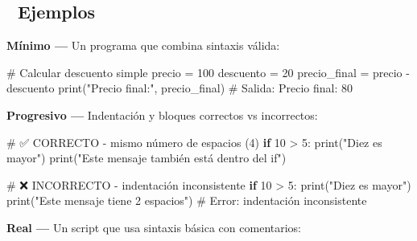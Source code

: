 \documentclass[
  doc,
  floatsintext,
  longtable,
  a4paper,
  nolmodern,
  notxfonts,
  notimes,
  12pt,
  colorlinks=true,linkcolor=blue,citecolor=blue,urlcolor=blue]{apa7}
\newenvironment{Shaded}{\begin{snugshade}}{\end{snugshade}}
\newcommand{\BuiltInTok}[1]{\textcolor[rgb]{0.00,0.23,0.31}{#1}}
\newcommand{\CommentTok}[1]{\textcolor[rgb]{0.37,0.37,0.37}{#1}}
\newcommand{\ControlFlowTok}[1]{\textcolor[rgb]{0.00,0.23,0.31}{\textbf{#1}}}
\newcommand{\DecValTok}[1]{\textcolor[rgb]{0.68,0.00,0.00}{#1}}
\newcommand{\NormalTok}[1]{\textcolor[rgb]{0.00,0.23,0.31}{#1}}
\newcommand{\OperatorTok}[1]{\textcolor[rgb]{0.37,0.37,0.37}{#1}}
\newcommand{\StringTok}[1]{\textcolor[rgb]{0.13,0.47,0.30}{#1}}
\begin{document}
\subsection{🔬 Ejemplos}\label{ejemplos}

\textbf{Mínimo ---} Un programa que combina sintaxis válida:

\begin{Shaded}
\begin{Highlighting}[]
\CommentTok{\# Calcular descuento simple}
\NormalTok{precio }\OperatorTok{=} \DecValTok{100}
\NormalTok{descuento }\OperatorTok{=} \DecValTok{20}
\NormalTok{precio\_final }\OperatorTok{=}\NormalTok{ precio }\OperatorTok{{-}}\NormalTok{ descuento}
\BuiltInTok{print}\NormalTok{(}\StringTok{"Precio final:"}\NormalTok{, precio\_final)}
\CommentTok{\# Salida: Precio final: 80}
\end{Highlighting}
\end{Shaded}

\textbf{Progresivo ---} Indentación y bloques correctos vs incorrectos:

\begin{Shaded}
\begin{Highlighting}[]
\CommentTok{\# ✅ CORRECTO {-} mismo número de espacios (4)}
\ControlFlowTok{if} \DecValTok{10} \OperatorTok{\textgreater{}} \DecValTok{5}\NormalTok{:}
    \BuiltInTok{print}\NormalTok{(}\StringTok{"Diez es mayor"}\NormalTok{)}
    \BuiltInTok{print}\NormalTok{(}\StringTok{"Este mensaje también está dentro del if"}\NormalTok{)}

\CommentTok{\# ❌ INCORRECTO {-} indentación inconsistente}
\ControlFlowTok{if} \DecValTok{10} \OperatorTok{\textgreater{}} \DecValTok{5}\NormalTok{:}
    \BuiltInTok{print}\NormalTok{(}\StringTok{"Diez es mayor"}\NormalTok{)}
  \BuiltInTok{print}\NormalTok{(}\StringTok{"Este mensaje tiene 2 espacios"}\NormalTok{)  }\CommentTok{\# Error: indentación inconsistente}
\end{Highlighting}
\end{Shaded}

\textbf{Real ---} Un script que usa sintaxis básica con comentarios:
\end{document}
